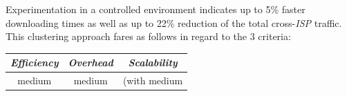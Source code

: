 Experimentation in a controlled environment indicates up to
5\% faster downloading times as well as up to 22\% reduction of 
the total cross-\emph{ISP} traffic.
This clustering approach fares as follows in regard 
to the $3$ criteria:
\begin{center}
{\footnotesize
\begin{tabular}{ccc}
\emph{Efficiency} & \emph{Overhead} & \emph{Scalability} \\
\hline
medium &
medium &
(with
medium
\end{tabular}
}
\end{center}


